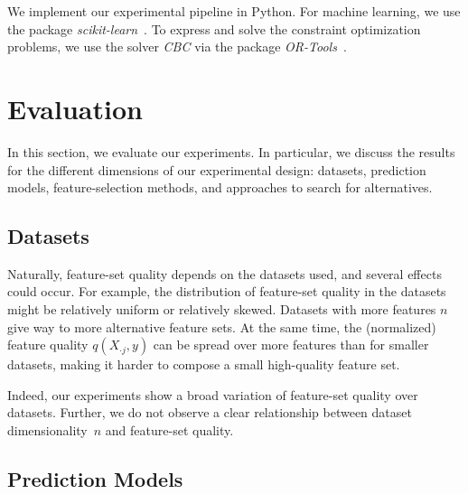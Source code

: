 \documentclass{article}
\theoremstyle{definition}
\begin{document}
We implement our experimental pipeline in Python.
For machine learning, we use the package \emph{scikit-learn}~\cite{pedregosa2011scikit-learn}.
To express and solve the constraint optimization problems, we use the solver \emph{CBC} via the package \emph{OR-Tools}~\cite{perron2022or-tools}.

\section{Evaluation}
\label{sec:evaluation}

In this section, we evaluate our experiments.
In particular, we discuss the results for the different dimensions of our experimental design:
datasets, prediction models, feature-selection methods, and approaches to search for alternatives.

\subsection{Datasets}
\label{sec:evaluation:datasets}

Naturally, feature-set quality depends on the datasets used, and several effects could occur.
For example, the distribution of feature-set quality in the datasets might be relatively uniform or relatively skewed.
Datasets with more features $n$ give way to more alternative feature sets.
At the same time, the (normalized) feature quality $q(X_{\cdot{}j},y)$ can be spread over more features than for smaller datasets, making it harder to compose a small high-quality feature set.

Indeed, our experiments show a broad variation of feature-set quality over datasets.
Further, we do not observe a clear relationship between dataset dimensionality~$n$ and feature-set quality.

\subsection{Prediction Models}
\label{sec:evaluation:prediction}
\end{document}
